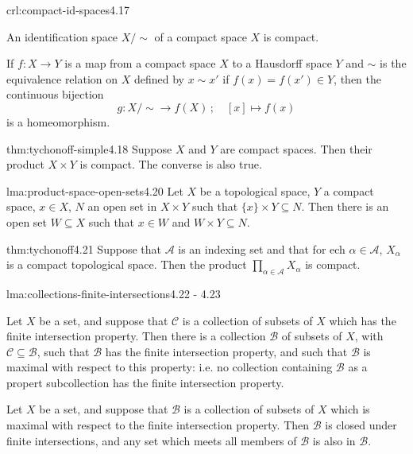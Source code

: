 \documentclass[landscape, 8pt]{extarticle}
\begin{document}
\begin{multicols}{3}
\begin{crl}{crl:compact-id-spaces}{4.17}
	\begin{enumerate-tight}
	    \item An identification space $X /\sim$ of a compact space $X$ is compact.
	    \item If $f: X \to Y $ is a map from a compact space $X$ to a Hausdorff space $Y$ and $\sim$ is the equivalence relation on $X$ defined by $x \sim x'$ if $f(x) = f(x') \in Y$, then the continuous bijection
			\[g : X / \sim \to f(X)\,;\quad [x] \mapsto f(x)\]
		is a homeomorphism.
	\end{enumerate-tight}
\end{crl}

\begin{thm}{thm:tychonoff-simple}{4.18}
	Suppose $X$ and $Y$ are compact spaces. Then their product $X \times Y$ is compact. The converse is also true.
\end{thm}

\begin{lma}{lma:product-space-open-sets}{4.20}
	Let $X$ be a topological space, $Y$ a compact space, $x\in X$, $N$ an open set in $X \times Y$ such that $\{x\} \times Y \subseteq N$. Then there is an open set $W \subseteq X$ such that $x \in W$ and $W \times Y \subseteq N$.
\end{lma}

\begin{thm}{thm:tychonoff}{4.21}
	Suppose that $\mathcal{A}$ is an indexing set and that for ech $\alpha\in \mathcal{A}$, $X_{\alpha}$ is a compact topological space. Then the product $\prod_{\alpha\in \mathcal{A}} X_{\alpha}$ is compact.
\end{thm}

\newpage

\begin{lma}{lma:collections-finite-intersections}{4.22 - 4.23}
	\begin{enumerate-tight}
		\item[\textbf{4.22})] Let $X$ be a set, and suppose that $\mathcal{C}$ is a collection of subsets of $X$ which has the finite intersection property. Then there is a collection $\mathcal{B}$ of subsets of $X$, with $\mathcal{C} \subseteq \mathcal{B}$, such that $\mathcal{B}$ has the finite intersection property, and such that $\mathcal{B}$ is maximal with respect to this property: i.e. no collection containing $\mathcal{B}$ as a propert subcollection has the finite intersection property.
		\item[\textbf{4.23})] Let $X$ be a set, and suppose that $\mathcal{B}$ is a collection of subsets of $X$ which is maximal with respect to the finite intersection property. Then $\mathcal{B}$ is closed under finite intersections, and any set which meets all members of $\mathcal{B}$ is also in $\mathcal{B}$.
	\end{enumerate-tight}
\end{lma}


\end{multicols}
\end{document}
